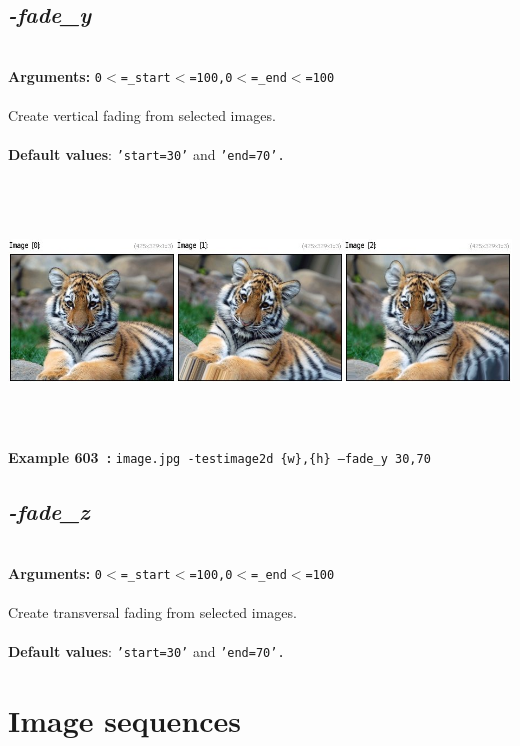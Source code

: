\documentclass[a4paper,11pt,twoside]{book}
\begin{document}
\subsection{\emph{-fade\_y} }\vspace*{-0.5em}
~\\\textbf{Arguments: } 
{\small \texttt{0$<$=\_start$<$=100,0$<$=\_end$<$=100}}\\~\\
Create vertical fading from selected images.
~\\~\\\textbf{Default values}: {\small \texttt{'start=30'} and \texttt{'end=70'.}}
\begin{center}\includegraphics[keepaspectratio=true,height=7cm,width=\textwidth]{img/gmic_def603.jpg}\\
{\footnotesize \textbf{Example 603~:} \texttt{image.jpg -testimage2d \{w\},\{h\} --fade\_y 30,70}}
\end{center}

\subsection{\emph{-fade\_z} }\vspace*{-0.5em}
~\\\textbf{Arguments: } 
{\small \texttt{0$<$=\_start$<$=100,0$<$=\_end$<$=100}}\\~\\
Create transversal fading from selected images.
~\\~\\\textbf{Default values}: {\small \texttt{'start=30'} and \texttt{'end=70'.}}

\section{Image sequences}
\end{document}
